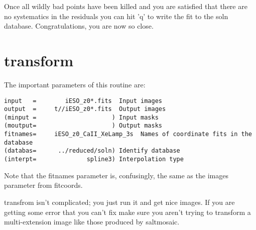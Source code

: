 \documentclass[letter,11pt,oneside]{article}
\begin{document}
Once all wildly bad points have been killed and you are satisfied that
there are no systematics in the residuals you can hit 'q' to write the
fit to the soln database. Congratulations, you are now so close.

\section{transform}

The important parameters of this routine are:

\begingroup \fontsize{10pt}{10pt}
\selectfont
\begin{verbatim} 
input   =        iESO_z0*.fits  Input images
output  =     t//iESO_z0*.fits  Output images
(minput =                     ) Input masks
(moutput=                     ) Output masks
fitnames=     iESO_z0_CaII_XeLamp_3s  Names of coordinate fits in the database
(databas=      ../reduced/soln) Identify database
(interpt=              spline3) Interpolation type
\end{verbatim}
\endgroup

Note that the fitnames parameter is, confusingly, the same as the
images parameter from fitcoords.

transfrom isn't complicated; you just run it and get nice images. If
you are getting some error that you can't fix make sure you aren't
trying to transform a multi-extension image like those produced by
saltmosaic.








\end{document}
